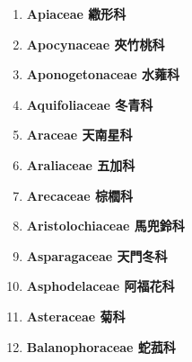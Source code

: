 \begin{enumerate}
        
      \item[] \begin{small}\textbf{Apiaceae 繖形科} \end{small}
        
      \item[] \begin{small}\textbf{Apocynaceae 夾竹桃科} \end{small}
        
      \item[] \begin{small}\textbf{Aponogetonaceae 水蕹科} \end{small}
        
      \item[] \begin{small}\textbf{Aquifoliaceae 冬青科} \end{small}
        
      \item[] \begin{small}\textbf{Araceae 天南星科} \end{small}
        
      \item[] \begin{small}\textbf{Araliaceae 五加科} \end{small}
        
      \item[] \begin{small}\textbf{Arecaceae 棕櫚科} \end{small}
        
      \item[] \begin{small}\textbf{Aristolochiaceae 馬兜鈴科} \end{small}
        
      \item[] \begin{small}\textbf{Asparagaceae 天門冬科} \end{small}
        
      \item[] \begin{small}\textbf{Asphodelaceae 阿福花科} \end{small}
        
      \item[] \begin{small}\textbf{Asteraceae 菊科} \end{small}
        
      \item[] \begin{small}\textbf{Balanophoraceae 蛇菰科} \end{small}

\end{enumerate}
